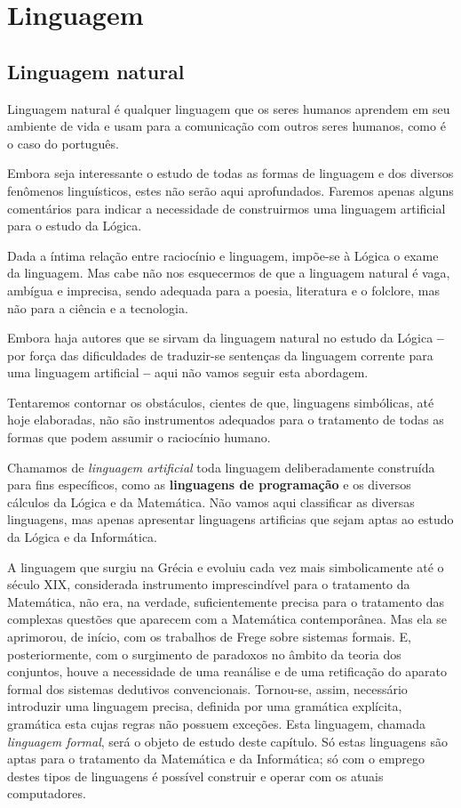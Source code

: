 
\chapter{Linguagem}
\section{Linguagem natural}

Linguagem natural é qualquer linguagem que os seres humanos aprendem em seu
ambiente de vida e usam para a comunicação com outros seres humanos, como é o
caso do português.

Embora seja interessante o estudo de todas as formas de linguagem e dos diversos
fenômenos linguísticos, estes não serão aqui aprofundados.
Faremos apenas alguns
comentários para indicar a necessidade de construirmos uma linguagem artificial
para o estudo da Lógica.

Dada a íntima relação entre raciocínio e linguagem, impõe-se à Lógica o exame da linguagem.
Mas cabe não nos esquecermos de que a linguagem natural é vaga, ambígua e imprecisa, sendo adequada para a poesia, literatura e o folclore, mas não para a ciência e a tecnologia.

Embora haja autores que se sirvam da linguagem natural no estudo da Lógica \textbf{--} por força das dificuldades de traduzir-se sentenças da linguagem corrente para uma linguagem artificial \textbf{--} aqui não vamos seguir esta abordagem.

Tentaremos contornar os obstáculos, cientes de que, linguagens simbólicas, até hoje elaboradas, não são instrumentos adequados para o tratamento de todas as formas que podem assumir o raciocínio humano.

\pagebreak

Chamamos de \emph{linguagem artificial}
toda linguagem deliberadamente construída para fins específicos, como as \textbf{linguagens de programação} e os diversos cálculos da Lógica e da Matemática.
Não vamos aqui classificar as diversas linguagens, mas apenas apresentar linguagens artificias que sejam aptas ao estudo da Lógica e da Informática.

A linguagem que surgiu na Grécia e evoluiu cada vez mais simbolicamente até o século XIX, considerada instrumento imprescindível para o tratamento da Matemática, não era, na verdade, suficientemente precisa para o tratamento das complexas questões que aparecem com a Matemática contemporânea.
Mas ela se aprimorou, de início, com os trabalhos de Frege sobre sistemas formais.
E, posteriormente, com o surgimento de paradoxos no âmbito da teoria dos conjuntos, houve a necessidade de uma reanálise e de uma retificação do aparato formal dos sistemas dedutivos convencionais.
Tornou-se, assim, necessário introduzir uma linguagem precisa, definida por uma gramática explícita, gramática esta cujas regras não possuem exceções.
Esta linguagem, chamada \emph{linguagem formal}, %
será o objeto de estudo deste capítulo.
Só estas linguagens são aptas para o tratamento da Matemática e da Informática;
só com o emprego destes tipos de linguagens é possível construir e operar com os atuais computadores.

